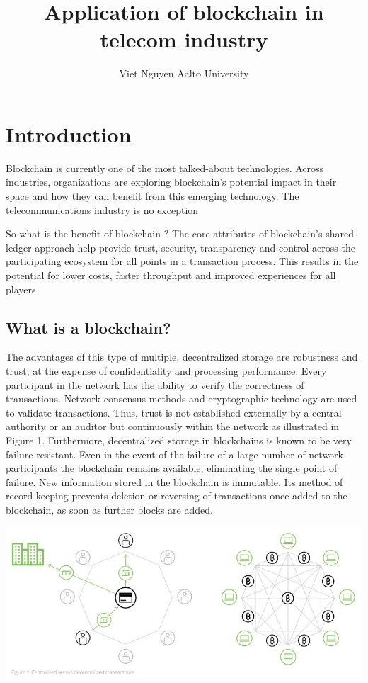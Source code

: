 \documentclass[12pt]{article}
\title{Application of blockchain in telecom industry}
\author{Viet Nguyen \newline Aalto University}
\date{}
\begin{document}
\maketitle

\tableofcontents
\clearpage

\section{Introduction}

\noindent

Blockchain is currently one of the most talked-about technologies. Across industries, organizations
are exploring blockchain’s potential impact in their space and how they can benefit from
this emerging technology. The telecommunications industry is no exception

So what is the benefit of blockchain ? The
core attributes of blockchain’s shared ledger approach help provide trust, security, transparency
and control across the participating ecosystem for all points in a transaction process.
This results in the potential for lower costs, faster throughput and improved experiences for all
players

\subsection{What is a blockchain?}

The advantages of this type of multiple,
decentralized storage are robustness and
trust, at the expense of confidentiality and
processing performance. Every participant
in the network has the ability to verify
the correctness of transactions. Network
consensus methods and cryptographic
technology are used to validate transactions.
Thus, trust is not established
externally by a central authority or an
auditor but continuously within the network
as illustrated in Figure 1. Furthermore,
decentralized storage in blockchains is
known to be very failure-resistant. Even in
the event of the failure of a large number of network participants the blockchain
remains available, eliminating the single
point of failure. New information stored in
the blockchain is immutable. Its method
of record-keeping prevents deletion or
reversing of transactions once added to the
blockchain, as soon as further blocks are
added. 

\includegraphics[width=1\textwidth]{"fig1.jpg"}
\end{document}
